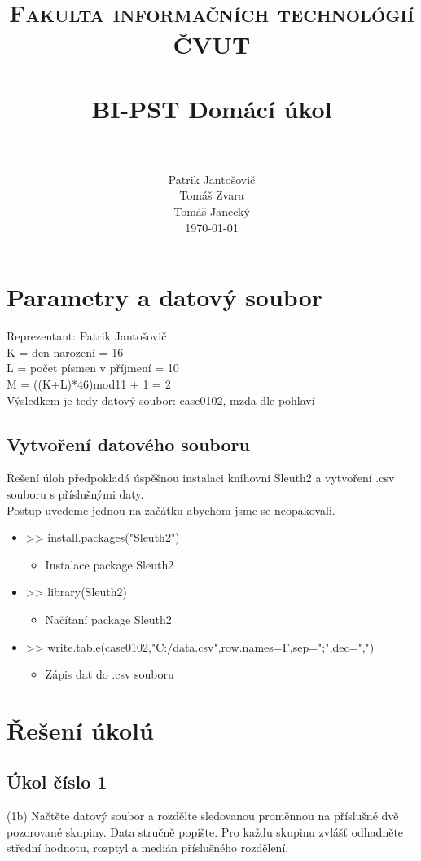 \documentclass[paper=a4, fontsize=12pt]{scrartcl}
\title{
		\usefont{OT1}{bch}{b}{n}
		\normalfont \normalsize \textsc{Fakulta informačních technológií ČVUT} \\ [25pt]
		\horrule{0.5pt} \\[0.4cm]
		\huge BI-PST Domácí úkol \\
		\horrule{2pt} \\[0.5cm]
}
\author{
		\normalfont 								\normalsize
        Patrik Jantošovič\\[-3pt]		\normalsize
        Tomáš Zvara\\[-3pt]		\normalsize
        Tomáš Janecký\\[-3pt]		\normalsize
        \today
}
\date{}
\numberwithin{equation}{section}		%
\numberwithin{figure}{section}			%
\numberwithin{table}{section}				%
\begin{document}
\maketitle
\section{Parametry a datový soubor}
Reprezentant: Patrik Jantošovič\\
K = den narození = 16\\
L = počet písmen v příjmení = 10\\
M = ((K+L)*46)mod11 + 1 = 2\\
Výsledkem je tedy datový soubor: case0102, mzda dle pohlaví\\

\subsection{Vytvoření datového souboru}
Řešení úloh předpokladá úspěšnou instalaci knihovni Sleuth2 a vytvoření .csv souboru s příslušnými daty.\\
Postup uvedeme jednou na začátku abychom jsme se neopakovali.

\begin{itemize}
	\item >> install.packages("Sleuth2")
		\begin{itemize}
		\item Instalace package Sleuth2 
		\end{itemize}
	\item >> library(Sleuth2)
		\begin{itemize}
		\item Načítaní package Sleuth2 
		\end{itemize}
	\item >> write.table(case0102,"C:/data.csv",row.names=F,sep=";",dec=",")
		\begin{itemize}
		\item Zápis dat do .csv souboru
		\end{itemize}
\end{itemize}

\section{Řešení úkolú}
\subsection{Úkol číslo 1}
(1b) Načtěte datový soubor a rozdělte sledovanou proměnnou na příslušné dvě pozorované skupiny. Data stručně popište. 
Pro každu skupinu zvlášť odhadněte střední hodnotu, rozptyl a medián příslušného rozdělení.
\end{document}

